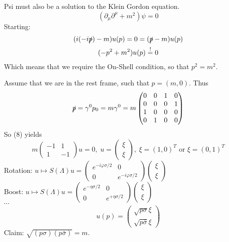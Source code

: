 \documentclass[]{scrartcl}
\begin{document}
Psi must also be a solution to the Klein Gordon equation.
\begin{equation}
	(\partial_\mu \partial^\mu + m^2)\psi = 0
\end{equation}
Starting:
\begin{gather}
	(i(-i\slashed p) - m)u(p) = 0 = (\slashed p - m)u(p)\\
	(-p^2 + m^2) u(p) \overset{!}{=} 0
\end{gather}
Which means that we require the On-Shell condition, so that $p^2 = m^2$.

Assume that we are in the rest frame, such that $p = (m,0)$. Thus
\begin{equation}
	\slashed p = \gamma^0 p_0 = m\gamma^0 = m
	\begin{pmatrix}
		0 & 0 & 1 & 0\\
		0 & 0 & 0 & 1\\
		1 & 0 & 0 & 0\\
		0 & 1 & 0 & 0
	\end{pmatrix}
\end{equation}
So (8) yields
\begin{equation}
	m
	\begin{pmatrix}
		-1 & 1\\
		1 & -1
	\end{pmatrix} u = 0, \; u =
	\begin{pmatrix}
		\xi \\ \xi
	\end{pmatrix},\; \xi = (1, 0)^T \text{ or } \xi = (0,1)^T
\end{equation}
Rotation: $u \mapsto S(\Lambda) u = 
\begin{pmatrix}
	e^{-i\varphi\sigma/2} & 0\\
	0 & e^{-i\varphi\sigma/2}
\end{pmatrix}
\begin{pmatrix}
	\xi \\ \xi
\end{pmatrix}
$\\
Boost: $u \mapsto S(\Lambda)u =
\begin{pmatrix}
	e^{-\eta\sigma/2} & 0\\
	0 & e^{+\eta\sigma/2}
\end{pmatrix}
\begin{pmatrix}
	\xi \\ \xi
\end{pmatrix}
$\\
$\cdots$
$$
u(p) =
\begin{pmatrix}
	\sqrt{p\sigma} \xi\\
	\sqrt{p\bar\sigma} \xi
\end{pmatrix}
$$
Claim: $\sqrt{(p\sigma)(p\bar\sigma)} = m$.
\end{document}
